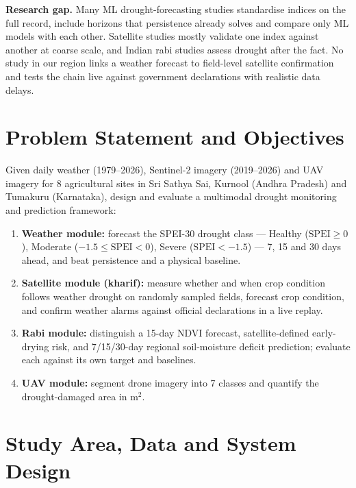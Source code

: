 \documentclass[11pt,a4paper,oneside]{article}
\begin{document}
\textbf{Research gap.} Many ML drought-forecasting studies standardise indices on the full record, include horizons that persistence already solves and compare only ML models with each other. Satellite studies mostly validate one index against another at coarse scale, and Indian rabi studies assess drought after the fact. No study in our region links a weather forecast to field-level satellite confirmation and tests the chain live against government declarations with realistic data delays.

\section{Problem Statement and Objectives}

Given daily weather (1979--2026), Sentinel-2 imagery (2019--2026) and UAV imagery for 8 agricultural sites in Sri Sathya Sai, Kurnool (Andhra Pradesh) and Tumakuru (Karnataka), design and evaluate a multimodal drought monitoring and prediction framework:
\begin{enumerate}
\item \textbf{Weather module:} forecast the SPEI-30 drought class --- Healthy ($\text{SPEI} \ge 0$), Moderate ($-1.5 \le \text{SPEI} < 0$), Severe ($\text{SPEI} < -1.5$) --- 7, 15 and 30 days ahead, and beat persistence and a physical baseline.
\item \textbf{Satellite module (kharif):} measure whether and when crop condition follows weather drought on randomly sampled fields, forecast crop condition, and confirm weather alarms against official declarations in a live replay.
\item \textbf{Rabi module:} distinguish a 15-day NDVI forecast, satellite-defined early-drying risk, and 7/15/30-day regional soil-moisture deficit prediction; evaluate each against its own target and baselines.
\item \textbf{UAV module:} segment drone imagery into 7 classes and quantify the drought-damaged area in m$^2$.
\end{enumerate}

\section{Study Area, Data and System Design}
\end{document}

